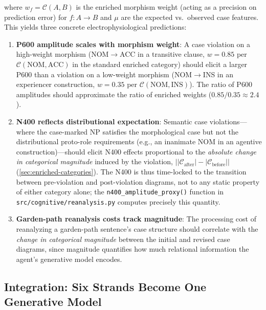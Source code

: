 \documentclass[
]{article}
\begin{document}
where \(w_f = \mathcal{C}(A,B)\) is the enriched morphism weight (acting
as a precision on prediction error) for \(f: A \to B\) and \(\mu\) are
the expected vs.~observed case features. This yields three concrete
electrophysiological predictions:

\begin{enumerate}
\def\labelenumi{\arabic{enumi}.}
\item
  \textbf{P600 amplitude scales with morphism weight}: A case violation
  on a high-weight morphism (NOM\texorpdfstring{\ensuremath{\to}}{->}ACC in a transitive clause,
  \(w = 0.85\) per \(\mathcal{C}(\text{NOM},\text{ACC})\) in the
  standard enriched category) should elicit a larger P600 than a
  violation on a low-weight morphism (NOM\texorpdfstring{\ensuremath{\to}}{->}INS in an experiencer
  construction, \(w = 0.35\) per
  \(\mathcal{C}(\text{NOM},\text{INS})\)). The ratio of P600 amplitudes
  should approximate the ratio of enriched weights
  (\(0.85/0.35 \approx 2.4\)).
\item
  \textbf{N400 reflects distributional expectation}: Semantic case
  violations---where the case-marked NP satisfies the morphological case
  but not the distributional proto-role requirements (e.g., an inanimate
  NOM in an agentive construction)---should elicit N400 effects
  proportional to the \emph{absolute change in categorical magnitude}
  induced by the violation,
  \(\big\lvert |\mathcal{C}_{\text{after}}| - |\mathcal{C}_{\text{before}}|\big\rvert\)
  (\autoref{sec:enriched-categories}). The N400 is thus time-locked to
  the transition between pre-violation and post-violation diagrams, not
  to any static property of either category alone; the
  \texttt{n400\_amplitude\_proxy()} function in
  \texttt{src/cognitive/reanalysis.py} computes precisely this quantity.
\item
  \textbf{Garden-path reanalysis costs track magnitude}: The processing
  cost of reanalyzing a garden-path sentence's case structure should
  correlate with the \emph{change in categorical magnitude} between the
  initial and revised case diagrams, since magnitude quantifies how much
  relational information the agent's generative model encodes.
\end{enumerate}

\subsection{Integration: Six Strands Become One Generative
Model}\label{integration-six-strands-become-one-generative-model}
\end{document}
